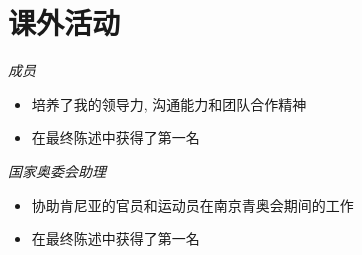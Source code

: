 \section{课外活动}
\textit{成员}
\begin{itemize}
  \item 培养了我的领导力, 沟通能力和团队合作精神
  \item 在最终陈述中获得了第一名
\end{itemize}

\textit{国家奥委会助理}
\begin{itemize}
  \item 协助肯尼亚的官员和运动员在南京青奥会期间的工作
  \item 在最终陈述中获得了第一名
\end{itemize}